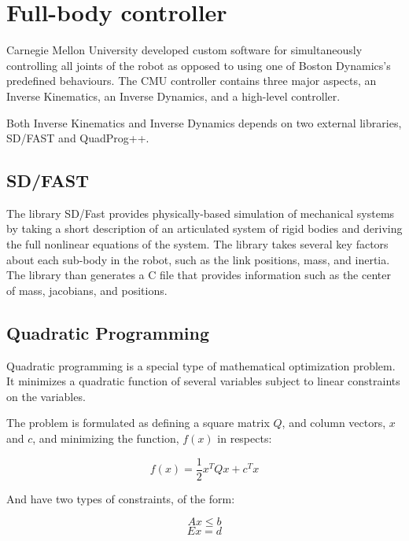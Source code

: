\documentclass[12pt]{report}
\begin{document}
\section{Full-body controller}
Carnegie Mellon University developed custom software for simultaneously controlling all joints of the robot as opposed to using one of Boston Dynamics's predefined behaviours. The CMU controller contains three major aspects, an Inverse Kinematics, an Inverse Dynamics, and a high-level controller. 

Both Inverse Kinematics and Inverse Dynamics depends on two external libraries, SD/FAST and QuadProg++. 

\subsection{SD/FAST}
The library SD/Fast provides physically-based simulation of mechanical systems by taking a short description of an articulated system of rigid bodies and deriving the full nonlinear equations of the system. \cite{sdfast} The library takes several key factors about each sub-body in the robot, such as the link positions, mass, and inertia. The library than generates a C file that provides information such as the center of mass, jacobians, and positions.



\subsection{Quadratic Programming}

Quadratic programming is a special type of mathematical optimization problem. It minimizes a quadratic function of several variables subject to linear constraints on the variables. 

The problem is formulated as defining a square matrix $Q$, and column vectors, $x$ and $c$, and minimizing the function, $f(x)$ in respects:

\begin{equation} 
f(x) = \frac{1}{2}x^TQx + c^Tx
\end{equation}

And have two types of constraints, of the form:

\begin{equation} 
Ax \le b 
\end{equation}
\begin{equation} 
Ex = d 
\end{equation}
\end{document}
